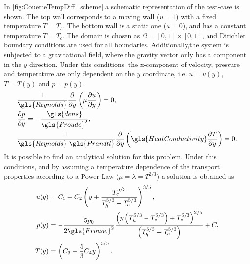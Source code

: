In \cref{fig:CouetteTempDiff_scheme} a schematic representation of the test-case is shown. The top wall corresponds to a moving wall ($u = 1$) with a fixed temperature $T=T_h$. The bottom wall is a static one ($u = 0$), and has a constant temperature $T = T_c$.
The domain is chosen as $\Omega = [0,1]\times[0,1]$, and Dirichlet boundary conditions are used for all boundaries. Additionally,the system is subjected to a gravitational field, where the gravity vector only has a component in the $y$ direction. Under this conditions, the x-component of velocity, pressure and temperature are only dependent on the $y$ coordinate, i.e. $u = u(y)$, $T = T(y)$ and $p = p(y)$. %
\begin{align}
	 & \frac{1}{\gls{Reynolds}} \pfrac{ }{y}\left(\mu\pfrac{u}{y}\right) = 0,                                  \\
	 & \pfrac{p}{y} = -\frac{\gls{dens}}{\gls{Froude}^2},                                                      \\
	 & \frac{1}{\gls{Reynolds}~\gls{Prandtl}} \pfrac{ }{y}\left(\gls{HeatConductivity}\pfrac{T}{y}\right) = 0.
\end{align}
It is possible to find an analytical solution for this problem.
Under this conditions, and by assuming a temperature dependence of the transport properties according to a Power Law ($\mu = \lambda = T^{2/3}$) a solution is obtained as
\begin{subequations}
	\begin{align}
		u(y) & = C_1 + C_2\left(y + \frac{T_c^{5/3}}{T_h^{5/3}-T_c^{5/3}} \right)^{3/5},\label{eq:CouetteU}                                                                 \\
		p(y) & = -\frac{5p_0}{2\gls{Froude}^2}\frac{\left(y\left(T_h^{5/3}-T_c^{5/3}\right)+T_c^{5/3}\right)^{2/5}}{\left(T_h^{5/3}-T_c^{5/3}\right)}+C,\label{eq:Couettep} \\
		T(y) & = \left(C_3 - \frac{5}{3}C_4 y\right)^{3/5}\label{eq:CouetteT}.
	\end{align}
\end{subequations}
